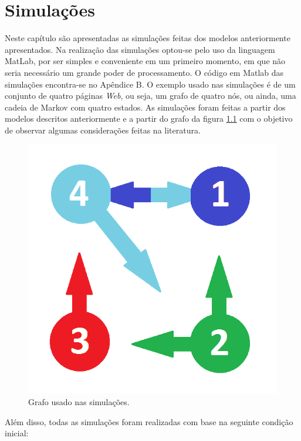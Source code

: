 \chapter{Simulações}%

Neste capítulo são apresentadas as simulações feitas dos modelos anteriormente apresentados. Na realização das simulações optou-se pelo uso da linguagem MatLab, por ser simples e conveniente em um primeiro momento, em que não seria necessário um grande poder de processamento. O código em Matlab das simulações encontra-se no Apêndice B. O exemplo usado nas simulações é de um conjunto de quatro páginas \textit{Web}, ou seja, um grafo de quatro nós, ou ainda, uma cadeia de Markov com quatro estados. As simulações foram feitas a partir dos modelos descritos anteriormente e a partir do grafo da figura \ref{grafoSimu} com o objetivo de observar algumas considerações feitas na literatura.

\begin{figure}[!htb]
	\centering
	\includegraphics[scale=0.4]{imagens/grafo}
	\caption{Grafo usado nas simulações.}
	\label{grafoSimu}
\end{figure}

\noindent Além disso, todas as simulações foram realizadas com base na seguinte condição inicial:

